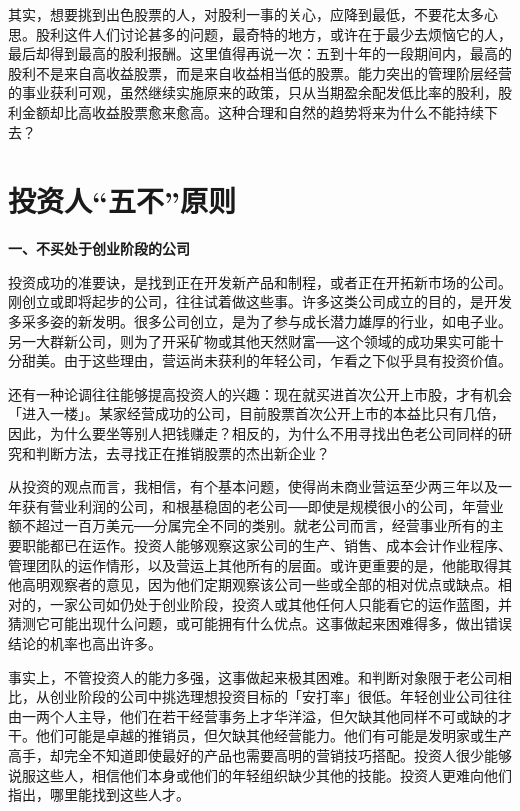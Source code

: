 \documentclass[UTF8,a4paper,zihao=-4,fontset = windows]{ctexart} %
\begin{document}
其实，想要挑到出色股票的人，对股利一事的关心，应降到最低，不要花太多心思。股利这件人们讨论甚多的问题，最奇特的地方，或许在于最少去烦恼它的人，最后却得到最高的股利报酬。这里值得再说一次：五到十年的一段期间内，最高的股利不是来自高收益股票，而是来自收益相当低的股票。能力突出的管理阶层经营的事业获利可观，虽然继续实施原来的政策，只从当期盈余配发低比率的股利，股利金额却比高收益股票愈来愈高。这种合理和自然的趋势将来为什么不能持续下去？

\section{投资人“五不”原则}

\textbf{一、不买处于创业阶段的公司}


投资成功的准要诀，是找到正在开发新产品和制程，或者正在开拓新市场的公司。刚创立或即将起步的公司，往往试着做这些事。许多这类公司成立的目的，是开发多采多姿的新发明。很多公司创立，是为了参与成长潜力雄厚的行业，如电子业。另一大群新公司，则为了开采矿物或其他天然财富──这个领域的成功果实可能十分甜美。由于这些理由，营运尚未获利的年轻公司，乍看之下似乎具有投资价值。

还有一种论调往往能够提高投资人的兴趣：现在就买进首次公开上市股，才有机会「进入一楼」。某家经营成功的公司，目前股票首次公开上市的本益比只有几倍，因此，为什么要坐等别人把钱赚走？相反的，为什么不用寻找出色老公司同样的研究和判断方法，去寻找正在推销股票的杰出新企业？

从投资的观点而言，我相信，有个基本问题，使得尚未商业营运至少两三年以及一年获有营业利润的公司，和根基稳固的老公司──即使是规模很小的公司，年营业额不超过一百万美元──分属完全不同的类别。就老公司而言，经营事业所有的主要职能都已在运作。投资人能够观察这家公司的生产、销售、成本会计作业程序、管理团队的运作情形，以及营运上其他所有的层面。或许更重要的是，他能取得其他高明观察者的意见，因为他们定期观察该公司一些或全部的相对优点或缺点。相对的，一家公司如仍处于创业阶段，投资人或其他任何人只能看它的运作蓝图，并猜测它可能出现什么问题，或可能拥有什么优点。这事做起来困难得多，做出错误结论的机率也高出许多。

事实上，不管投资人的能力多强，这事做起来极其困难。和判断对象限于老公司相比，从创业阶段的公司中挑选理想投资目标的「安打率」很低。年轻创业公司往往由一两个人主导，他们在若干经营事务上才华洋溢，但欠缺其他同样不可或缺的才干。他们可能是卓越的推销员，但欠缺其他经营能力。他们有可能是发明家或生产高手，却完全不知道即使最好的产品也需要高明的营销技巧搭配。投资人很少能够说服这些人，相信他们本身或他们的年轻组织缺少其他的技能。投资人更难向他们指出，哪里能找到这些人才。
\end{document}
